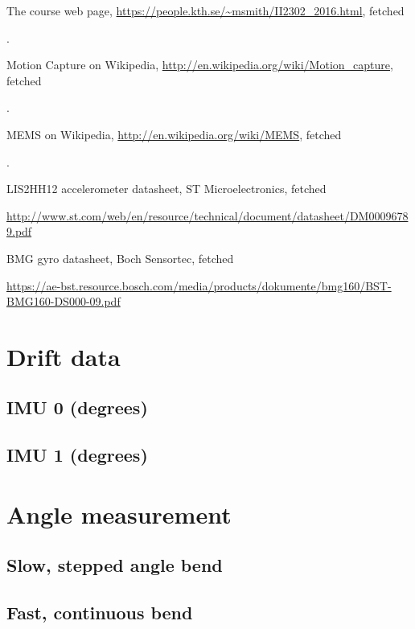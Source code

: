 \documentclass[a4paper, 12pt]{article}
\begin{document}
\begin{thebibliography}{7}

	The course web page,
	\url{https://people.kth.se/~msmith/II2302\_2016.html}, fetched \date{\today{}}.

	Motion Capture on Wikipedia,
	\url{http://en.wikipedia.org/wiki/Motion\_capture}, fetched \date{\today{}}.

	MEMS on Wikipedia,
	\url{http://en.wikipedia.org/wiki/MEMS}, fetched \date{\today{}}.


        LIS2HH12 accelerometer datasheet, ST Microelectronics, fetched \date{\today{}}
        \url{http://www.st.com/web/en/resource/technical/document/datasheet/DM00096789.pdf}
	
        BMG gyro datasheet, Boch Sensortec, fetched \date{\today{}}
        \url{https://ae-bst.resource.bosch.com/media/products/dokumente/bmg160/BST-BMG160-DS000-09.pdf}
	

\end{thebibliography}

\begin{appendices}

\section{Drift data}
\subsection{IMU 0 (degrees)}
\tiny
{}
\normalsize
\subsection{IMU 1 (degrees)}
\tiny
{}
\normalsize

\section{Angle measurement}
\subsection{Slow, stepped angle bend}
\tiny
{}
\normalsize
\subsection{Fast, continuous bend}
\tiny
{}
\normalsize
\end{appendices}
\end{document}
